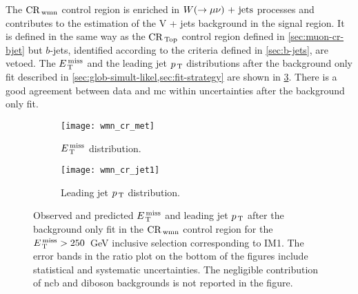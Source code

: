 The $\mathrm{CR}_\mathrm{\, wmn}$ control region is enriched in $W (\rightarrow \mu \nu)\mathrm{~+~jets}$ processes and
contributes to the estimation of the V + jets background in the signal
region. It is defined in the same way as the $\mathrm{CR}_\mathrm{\, Top}$ control region defined in
\cref{sec:muon-cr-bjet} but $b$-jets, identified according to the criteria
defined in \cref{sec:b-jets}, are vetoed. The $E_\mathrm{\, T}^\mathrm{\, miss}$ and the leading jet $p_\mathrm{\, T}$
distributions after the background only fit described in
\cref{sec:glob-simult-likel,sec:fit-strategy} are shown in
\cref{fig:wmn_plots}. There is a good agreement between data and \gls{mc} within
uncertainties after the background only fit.
\begin{figure}[!th]
  \centering
  \begin{subfigure}[t]{.48\linewidth}
    \texttt{[image: wmn\_cr\_met]}
    \caption{$E_\mathrm{\, T}^\mathrm{\, miss}$ distribution.}
    \label{fig:wmn_cr_et_miss}
  \end{subfigure}
  \begin{subfigure}[t]{.48\linewidth}
    \texttt{[image: wmn\_cr\_jet1]}
    \caption{Leading jet $p_\mathrm{\, T}$ distribution.}
    \label{fig:wmn_cr_jet1}
  \end{subfigure}
  \caption{Observed and predicted $E_\mathrm{\, T}^\mathrm{\, miss}$ and leading jet $p_\mathrm{\, T}$ after the
    background only fit in the $\mathrm{CR}_\mathrm{\, wmn}$ control region for the $E_\mathrm{\, T}^\mathrm{\, miss} > 250$~GeV
    inclusive selection corresponding to IM1. The error bands in the ratio plot
    on the bottom of the figures include statistical and systematic
    uncertainties. The negligible contribution of \gls{ncb} and diboson
    backgrounds is not reported in the figure.}
  \label{fig:wmn_plots}
\end{figure}
\pagebreak[4]
